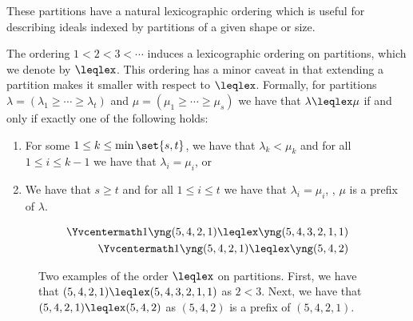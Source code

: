 \documentclass[letterpaper, 11pt]{amsart}
\begin{document}
These partitions have a natural lexicographic ordering which is useful for describing ideals indexed by partitions of a given shape or size.
\begin{defn}\label{defn:lex}
    The ordering $1 < 2 < 3 < \cdots$ induces a lexicographic ordering on partitions, which we denote by $\leqlex$.
    This ordering has a minor caveat in that extending a partition makes it smaller with respect to $\leqlex$.
    Formally, for partitions $\lambda = (\lambda_1 \geq \cdots \geq \lambda_t)$ and $\mu = (\mu_1 \geq \cdots \geq \mu_s)$ we have that $\lambda \leqlex \mu$ if and only if exactly one of the following holds:
    \begin{enumerate}
        \item For some $1 \leq k \leq \min\set{s, t}$, we have that $\lambda_k < \mu_k$ and for all $1 \leq i \leq k - 1$ we have that $\lambda_i = \mu_i$, or
        \item We have that $s \geq t$ and for all $1 \leq i \leq t$ we have that $\lambda_i = \mu_i$, \ie, $\mu$ is a prefix of $\lambda$.
    \end{enumerate}
    \begin{figure}[H]
        \centering
        \begin{align*}
            \Yvcentermath1 \yng(5,4,2,1) \leqlex \yng(5,4,3,2,1,1) \\
            \Yvcentermath1 \yng(5,4,2,1) \leqlex \yng(5,4,2)           
        \end{align*}
        \caption{
            Two examples of the order $\leqlex$ on partitions.
            First, we have that $(5, 4, 2, 1) \leqlex (5, 4, 3, 2, 1, 1)$ as $2 < 3$.
            Next, we have that $(5, 4, 2, 1) \leqlex (5, 4, 2)$ as $(5, 4, 2)$ is a prefix of $(5, 4, 2, 1)$.
        }\label{fig:lex_examples}
    \end{figure} 
\end{defn}
\end{document}
